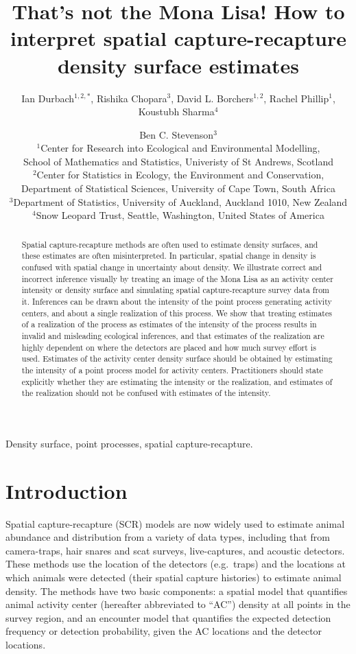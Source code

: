 \documentclass[useAMS,usenatbib,referee]{biom}
\title[How to interpret SCR density surface estimates]{That's not the Mona Lisa! How to interpret spatial capture-recapture density surface estimates}
\author{Ian Durbach$^{1,2,*}$, Rishika Chopara$^{3}$, David L. Borchers$^{1,2}$, Rachel Phillip$^{1}$, Koustubh Sharma$^{4}$ \and Ben C. Stevenson$^{3}$ \\
$^{1}$Center for Research into Ecological and Environmental Modelling, \\ School of Mathematics and Statistics, Univeristy of St Andrews, Scotland \\
$^{2}$Center for Statistics in Ecology, the Environment and Conservation, \\ Department of Statistical Sciences, University of Cape Town, South Africa \\
$^{3}$Department of Statistics, University of Auckland, Auckland 1010, New Zealand \\
$^{4}$Snow Leopard Trust, Seattle, Washington, United States of America \\
\email{indurbach@gmail.com}}
\begin{document}
\begin{abstract}
Spatial capture-recapture methods are often used to estimate density surfaces, and these estimates are often misinterpreted. In particular, spatial change in density is confused with spatial change in uncertainty about density. We illustrate correct and incorrect inference visually by treating an image of the Mona Lisa as an activity center intensity or density surface and simulating spatial capture-recapture survey data from it. Inferences can be drawn about the intensity of the point process generating activity centers, and about a single realization of this process. We show that treating estimates of a realization of the process as estimates of the intensity of the process results in invalid and misleading ecological inferences, and that estimates of the realization are highly dependent on where the detectors are placed and how much survey effort is used. Estimates of the activity center density surface should be obtained by estimating the intensity of a point process model for activity centers. Practitioners should state explicitly whether they are estimating the intensity or the realization, and estimates of the realization should not be confused with estimates of the intensity.
\end{abstract}


\begin{keywords}
Density surface, point processes, spatial capture-recapture.
\end{keywords}

\maketitle 

\section{Introduction}

Spatial capture-recapture (SCR) models \citep*{Efford:04,Borchers+Efford:08, Royle+Young:08} are now widely used to estimate animal abundance and distribution from a variety of data types, including that from camera-traps, hair snares and scat surveys, live-captures, and acoustic detectors. These methods use the location of the detectors (e.g.\ traps) and the locations at which animals were detected (their spatial capture histories) to estimate animal density. The methods have two basic components: a spatial model that quantifies animal activity center (hereafter abbreviated to ``AC'') density at all points in the survey region, and an encounter model that quantifies the expected detection frequency or detection probability, given the AC locations and the detector locations. 
\end{document}
